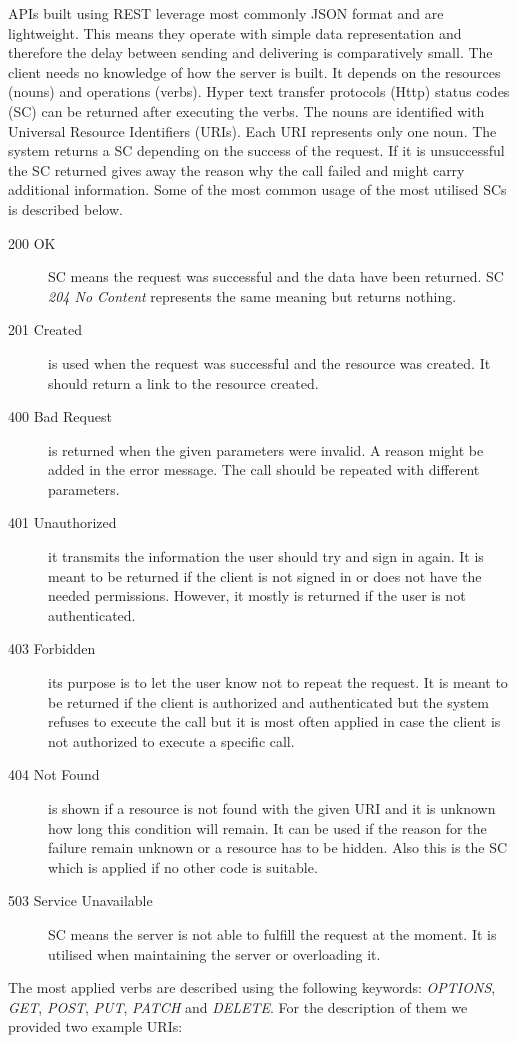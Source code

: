 APIs built using REST leverage most commonly JSON format and are lightweight. This means they operate with simple data representation and therefore the delay between sending and delivering is comparatively small. The client needs no knowledge of how the server is built. It depends on the resources (nouns) and operations (verbs). Hyper text transfer protocols (Http) status codes (SC) can be returned after executing the verbs. The nouns are identified with Universal Resource Identifiers (URIs). Each URI represents only one noun. The system returns a SC depending on the success of the request. If it is unsuccessful the SC returned gives away the reason why the call failed and might carry additional information. Some of the most common usage of the most utilised SCs is described below\cite{rfc-2616}.
\begin {description}
\item [200 OK] SC means the request was successful and the data have been returned. SC \textit{204 No Content} represents the same meaning but returns nothing.
\item [201 Created] is used when the request was successful and the resource was created. It should return a link to the resource created.
\item [400 Bad Request] is returned when the given parameters were invalid. A reason might be added in the error message. The call should be repeated with different parameters.
\item [401 Unauthorized] it transmits the information the user should try and sign in again. It is meant to be returned if the client is not signed in or does not have the needed permissions. However, it mostly is returned if the user is not authenticated.
\item [403 Forbidden] its purpose is to let the user know not to repeat the request. It is meant to be returned if the client is authorized and authenticated but the system refuses to execute the call but it is most often applied in case the client is not authorized to execute a specific call.
\item [404 Not Found] is shown if a resource is not found with the given URI and it is unknown how long this condition will remain. It can be used if the reason for the failure remain unknown or a resource has to be hidden. Also this is the SC which is applied if no other code is suitable.
\item [503 Service Unavailable] SC means the server is not able to fulfill the request at the moment. It is utilised when maintaining the server or overloading it.
\end{description}	
The most applied verbs are described using the following keywords: \textit{OPTIONS}, \textit{GET}, \textit{POST}, \textit{PUT}, \textit{PATCH} and \textit{DELETE}. For the description of them we provided two example URIs:

